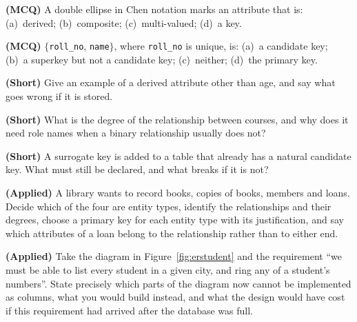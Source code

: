 \begin{reviewq}
  \item \textbf{(MCQ)} A double ellipse in Chen notation marks an attribute
        that is: (a)~derived; (b)~composite; (c)~multi-valued; (d)~a key.
  \item \textbf{(MCQ)} $\{$\texttt{roll\_no}, \texttt{name}$\}$, where
        \texttt{roll\_no} is unique, is: (a)~a candidate key; (b)~a superkey
        but not a candidate key; (c)~neither; (d)~the primary key.
  \item \textbf{(Short)} Give an example of a derived attribute other than age,
        and say what goes wrong if it is stored.
  \item \textbf{(Short)} What is the degree of the 
        relationship between courses, and why does it need role names when a
        binary relationship usually does not?
  \item \textbf{(Short)} A surrogate key is added to a table that already has a
        natural candidate key. What must still be declared, and what breaks if
        it is not?
  \item \textbf{(Applied)} A library wants to record books, copies of books,
        members and loans. Decide which of the four are entity types, identify
        the relationships and their degrees, choose a primary key for each
        entity type with its justification, and say which attributes of a loan
        belong to the relationship rather than to either end.
  \item \textbf{(Applied)} Take the  diagram in
        Figure~\ref{fig:erstudent} and the requirement ``we must be able to
        list every student in a given city, and ring any of a student's
        numbers''. State precisely which parts of the diagram now cannot be
        implemented as columns, what you would build instead, and what the
        design would have cost if this requirement had arrived after the
        database was full.
\end{reviewq}

